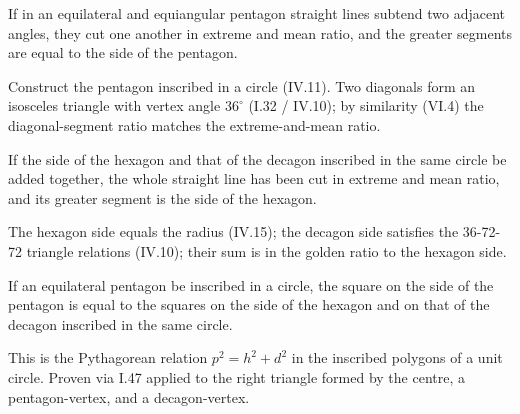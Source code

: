 \documentclass{rrxiv}
\begin{document}
\begin{claim}
\label{prop:XIII.8}
If in an equilateral and equiangular pentagon straight lines subtend
two adjacent angles, they cut one another in extreme and mean ratio,
and the greater segments are equal to the side of the pentagon.
\end{claim}
\begin{evidence}
\label{ev:XIII.8}
Construct the pentagon inscribed in a circle (IV.11).  Two diagonals
form an isosceles triangle with vertex angle $36^\circ$ (I.32 / IV.10);
by similarity (VI.4) the diagonal-segment ratio matches the
extreme-and-mean ratio.
\end{evidence}

\begin{claim}
\label{prop:XIII.9}
If the side of the hexagon and that of the decagon inscribed in the
same circle be added together, the whole straight line has been cut
in extreme and mean ratio, and its greater segment is the side of
the hexagon.
\end{claim}
\begin{evidence}
\label{ev:XIII.9}
The hexagon side equals the radius (IV.15); the decagon side
satisfies the 36-72-72 triangle relations (IV.10); their sum is in
the golden ratio to the hexagon side.
\end{evidence}

\begin{claim}
\label{prop:XIII.10}
If an equilateral pentagon be inscribed in a circle, the square on
the side of the pentagon is equal to the squares on the side of the
hexagon and on that of the decagon inscribed in the same circle.
\end{claim}
\begin{evidence}
\label{ev:XIII.10}
This is the Pythagorean relation $p^2 = h^2 + d^2$ in the inscribed
polygons of a unit circle.  Proven via I.47 applied to the right
triangle formed by the centre, a pentagon-vertex, and a decagon-vertex.
\end{evidence}
\end{document}
